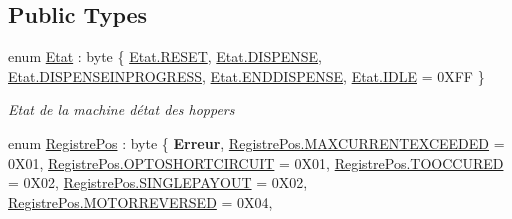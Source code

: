 \subsection*{Public Types}
\begin{DoxyCompactItemize}
\item 
enum \mbox{\hyperlink{class_device_library_1_1_c_hopper_a5f54d84c3b2a93420c8ff69b1351c77a}{Etat}} \+: byte \{ \newline
\mbox{\hyperlink{class_device_library_1_1_c_hopper_a5f54d84c3b2a93420c8ff69b1351c77aab5859d8721cfdc0312b2838b9c985bc1}{Etat.\+R\+E\+S\+ET}}, 
\mbox{\hyperlink{class_device_library_1_1_c_hopper_a5f54d84c3b2a93420c8ff69b1351c77aaf55af7d8c1565860959f0a29bb0b1c68}{Etat.\+D\+I\+S\+P\+E\+N\+SE}}, 
\mbox{\hyperlink{class_device_library_1_1_c_hopper_a5f54d84c3b2a93420c8ff69b1351c77aa2694f660e3aace318710c802c4026c41}{Etat.\+D\+I\+S\+P\+E\+N\+S\+E\+I\+N\+P\+R\+O\+G\+R\+E\+SS}}, 
\mbox{\hyperlink{class_device_library_1_1_c_hopper_a5f54d84c3b2a93420c8ff69b1351c77aa8116fffa8cbfef37beeb326b739da585}{Etat.\+E\+N\+D\+D\+I\+S\+P\+E\+N\+SE}}, 
\newline
\mbox{\hyperlink{class_device_library_1_1_c_hopper_a5f54d84c3b2a93420c8ff69b1351c77aaa5daf7f2ebbba4975d61dab1c40188c7}{Etat.\+I\+D\+LE}} = 0\+X\+FF
 \}
\begin{DoxyCompactList}\small\item\em Etat de la machine d\textquotesingle{}état des hoppers \end{DoxyCompactList}\item 
enum \mbox{\hyperlink{class_device_library_1_1_c_hopper_afce8f2089a688f1d3fdf9db91242fb01}{Registre\+Pos}} \+: byte \{ \newline
{\bfseries Erreur}, 
\mbox{\hyperlink{class_device_library_1_1_c_hopper_afce8f2089a688f1d3fdf9db91242fb01a352f5cd9841dc6e7e999caee1c876c11}{Registre\+Pos.\+M\+A\+X\+C\+U\+R\+R\+E\+N\+T\+E\+X\+C\+E\+E\+D\+ED}} = 0\+X01, 
\mbox{\hyperlink{class_device_library_1_1_c_hopper_afce8f2089a688f1d3fdf9db91242fb01ad8dffe032a7fbd1f7291f20a1d24fff9}{Registre\+Pos.\+O\+P\+T\+O\+S\+H\+O\+R\+T\+C\+I\+R\+C\+U\+IT}} = 0\+X01, 
\mbox{\hyperlink{class_device_library_1_1_c_hopper_afce8f2089a688f1d3fdf9db91242fb01a89249c979952ff149dff1f387f78fe0c}{Registre\+Pos.\+T\+O\+O\+C\+C\+U\+R\+ED}} = 0\+X02, 
\newline
\mbox{\hyperlink{class_device_library_1_1_c_hopper_afce8f2089a688f1d3fdf9db91242fb01a2c6dbfb7f793fa40620ac62174479d61}{Registre\+Pos.\+S\+I\+N\+G\+L\+E\+P\+A\+Y\+O\+UT}} = 0\+X02, 
\mbox{\hyperlink{class_device_library_1_1_c_hopper_afce8f2089a688f1d3fdf9db91242fb01a6f836722e3e4f3c3a219159530d2e965}{Registre\+Pos.\+M\+O\+T\+O\+R\+R\+E\+V\+E\+R\+S\+ED}} = 0\+X04, 

\end{DoxyCompactItemize}
